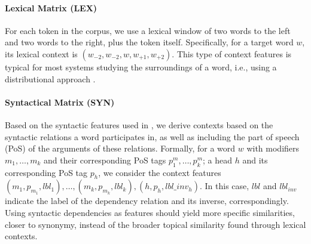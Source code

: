 \paragraph{Lexical Matrix (LEX)}
For each token in the corpus, we use a lexical window of two words to the left and two words to the right, plus the token itself. Specifically, for a target word $w$, its lexical context is $(w_{-2}, w_{-2}, w, w_{+1}, w_{+2})$. This type of context features is typical for most systems studying the surroundings of a word, i.e., using a distributional approach \cite{LevyG14}.

\paragraph{Syntactical Matrix (SYN)}
Based on the syntactic features used in   \cite{LevyG14,Panchenko2017}, we derive contexts based on the syntactic relations a word participates in, as well as including the part of speech (PoS) of the arguments of these relations. Formally, for a word $w$ with modifiers $m_1, \dots, m_k$ and their corresponding PoS tags $p^m_1, \dots, p^m_k$; a head $h$ and its corresponding PoS tag $p_h$, we consider the context features $(m_1, p_{m_1}, lbl_1), \dots, \allowbreak (m_k, p_{m_k}, lbl_k), \allowbreak (h,p_h,lbl\_inv_h)$. In this case, $lbl$ and $lbl_{inv}$ indicate the label of the dependency relation and its inverse, correspondingly. Using syntactic dependencies as features should yield more specific similarities, closer to synonymy, instead of the broader topical similarity found through lexical contexts.
